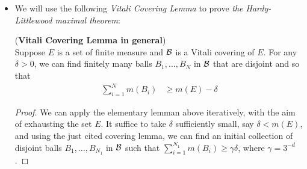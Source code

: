 \documentclass[11pt]{article}
\begin{document}
\begin{itemize}
\begin{remark}
\begin{itemize}
\begin{proof}
First, we pick a ball $B_{i_1}$ in $\cB$ with \emph{maximal} (largest) radius, and then delete it from  $\cB$ as well as any ball that intersect with $B_{i_1}$. Thus all deleted balls are contained in the ball $\tilde{B}_{i_1}$ concentric with $B_{i_1}$ with $3$-times its radius.

Then the remaining balls yield a new collection $\cB'$, from which we could repeat the above procedure.  After at most $N$ steps, we obtain a collection of disjoint balls $\tilde{B}_{i_1}, \tilde{B}_{i_2},\ldots, \tilde{B}_{i_k}$.

Finally, we need to prove that the disjoint balls satisfies the above inequality. We use the observation made at the beginning of the proof. Let $\tilde{B}_{i_j}$ be the ball that is concentric to $B_{i_j}$, but with $3$-times its radius. Since any ball $B$ in $\cB$ must a ball $B_{i_j}$ and have equal or smaller radius than $B_{i_j}$, we must have $B\subset \tilde{B}_{i_j}$, thus 
\begin{align*}
m\paren{\bigcup_{s=1}^{N}B_{s}}&\le m\paren{\bigcup_{j=1}^{k} \tilde{B}_{i_j}} \\
&\le \sum_{j=1}^{k}m\paren{\tilde{B}_{i_j}} \\
&= 3^{d}\sum_{j=1}^{k}m\paren{B_{i_j}} 
\end{align*}
In last equality, we use the fact that in $\bR^{d}$ a dilation of a set by $\delta>0$ results in the multiplication of $\delta^{d}$ of the Lebesgue measure. \qed
\end{proof}


\item We will use the following \emph{Vitali Covering Lemma} to prove \emph{the Hardy-Littlewood maximal theorem}: 
\begin{lemma} (\textbf{Vitali Covering Lemma in general})  \citep{stein2009real, folland2013real}\\
Suppose $E$ is a set of finite measure and $\cB$ is a Vitali covering of $E$. For any $\delta>0$, we can find finitely many balls $B_{1},\ldots, B_{N}$ in $\cB$ that are disjoint and so that 
\begin{align*}
\sum_{i=1}^{N}m(B_{i}) &\ge m(E) - \delta
\end{align*}
\end{lemma}
\begin{proof}
We can apply the elementary lemman above iteratively, with the aim of exhausting the set $E$. It suffice to take $\delta$ sufficiently small, say $\delta < m(E)$, and using the just cited covering lemma, we can find an initial collection of disjoint balls $B_{1}, \ldots, B_{N_1}$ in $\cB$ such that $\sum_{i=1}^{N_1}m(B_{i}) \ge \gamma\delta$, where $\gamma = 3^{-d}$.


\end{proof}
\end{itemize}
\end{remark}
\end{itemize}
\end{document}
